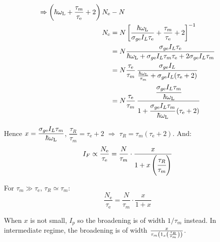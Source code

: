 \begin{parts}
	\begin{align*}
		\Rightarrow \left(\hbar\omega_\textnormal{L} + \frac{\tau_m}{\tau_\mathrm{e}} + 2\right) N_\mathrm{e} &- N \\
		N_\mathrm{e} &= N \left[\frac{\hbar\omega_\textnormal{L}}{\sigma_{g\mathrm{e}} I_L \tau_\mathrm{e}} + \frac{\tau_m}{\tau_\mathrm{e}} + 2\right]^{-1} \\
		&= N \frac{\sigma_{g\mathrm{e}} I_L \tau_\mathrm{e}}{\hbar\omega_\textnormal{L} + \sigma_{g\mathrm{e}} I_L \tau_m \tau_\mathrm{e} + 2\sigma_{g\mathrm{e}} I_L \tau_m} \\
		&= N \frac{\tau_\mathrm{e}}{\tau_m} \, \frac{\sigma_{g\mathrm{e}} I_L}{\frac{\hbar\omega_\textnormal{L}}{\tau_m} + \sigma_{g\mathrm{e}} I_L (\tau_\mathrm{e} + 2)} \\
		&=  N \frac{\tau_\mathrm{e}}{\tau_m} \, \cfrac{\cfrac{\sigma_{g\mathrm{e}} I_L \tau_m}{\hbar\omega_\textnormal{L}}}{1+\cfrac{\sigma_{g\mathrm{e}} I_L \tau_m}{\hbar\omega_\textnormal{L}} \left(\tau_\mathrm{e} + 2\right)}
	\end{align*}
	
	Hence $x=\dfrac{\sigma_{g\mathrm{e}} I_L \tau_m}{\hbar\omega_\textnormal{L}}$, $\dfrac{\tau_R}{\tau_m} = \tau_\mathrm{e} + 2$ $\Rightarrow$ $\tau_R = \tau_m (\tau_\mathrm{e} + 2)$.
	And:
	\begin{equation*}
		I_F \propto \frac{N_\mathrm{e}}{\tau_\mathrm{e}} = \frac{N}{\tau_m} \cdot \frac{x}{1+x\left(\cfrac{\tau_R}{\tau_m}\right)}
	\end{equation*}
	
	For $\tau_m \gg \tau_\mathrm{e}$, $\tau_R \simeq \tau_m$:
	\begin{equation*}
		\frac{N_\mathrm{e}}{\tau_\mathrm{e}} = \frac{N}{\tau_m} \cdot \frac{x}{1+x}
	\end{equation*}
	
	
	When $x$ is not small, $I_p$ so the broadening is of width $1/\tau_m$ instead.
	In intermediate regime, the broadening is of width $\frac{x}{\tau_m \left(1_x\left(\frac{\tau_R}{\tau_m}\right)\right)}$.
\end{parts}